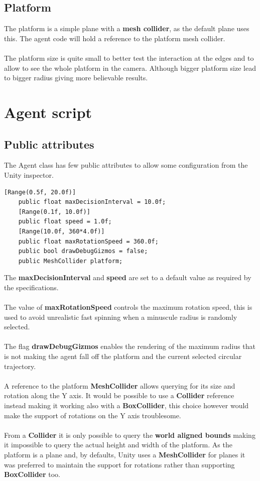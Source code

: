 \documentclass[12pt, a4paper]{article}
\begin{document}
\subsection{Platform}
The platform is a simple plane with a \textbf{mesh collider}, as the default plane uses this. The agent code will hold a reference to the platform mesh collider.\\\\
The platform size is quite small to better test the interaction at the edges and to allow to see the whole platform in the camera. Although bigger platform size lead to bigger radius giving more believable results.

\section{Agent script}
\subsection{Public attributes}
The Agent class has few public attributes to allow some configuration from the Unity inspector.
\begin{lstlisting}[caption={Public attributes}]
    [Range(0.5f, 20.0f)]
    public float maxDecisionInterval = 10.0f;
    [Range(0.1f, 10.0f)]
    public float speed = 1.0f;
    [Range(10.0f, 360*4.0f)]
    public float maxRotationSpeed = 360.0f;
    public bool drawDebugGizmos = false;
    public MeshCollider platform;
\end{lstlisting}
The \textbf{maxDecisionInterval} and \textbf{speed} are set to a default value as required by the specifications.\\\\
The value of \textbf{maxRotationSpeed} controls the maximum rotation speed, this is used to avoid unrealistic fast spinning when a minuscule radius is randomly selected.\\\\
The flag \textbf{drawDebugGizmos} enables the rendering of the maximum radius that is not making the agent fall off the platform and the current selected circular trajectory.\\\\
A reference to the platform \textbf{MeshCollider} allows querying for its size and rotation along the Y axis.
It would be possible to use a \textbf{Collider} reference instead making it working also with a \textbf{BoxCollider}, this choice however would make the support of rotations on the Y axis troublesome.\\\\
From a \textbf{Collider} it is only possible to query the \textbf{world aligned bounds} making it impossible to query the actual height and width of the platform.
As the platform is a plane and, by defaults, Unity uses a \textbf{MeshCollider} for planes it was preferred to maintain the support for rotations rather than supporting \textbf{BoxCollider} too.
\end{document}
